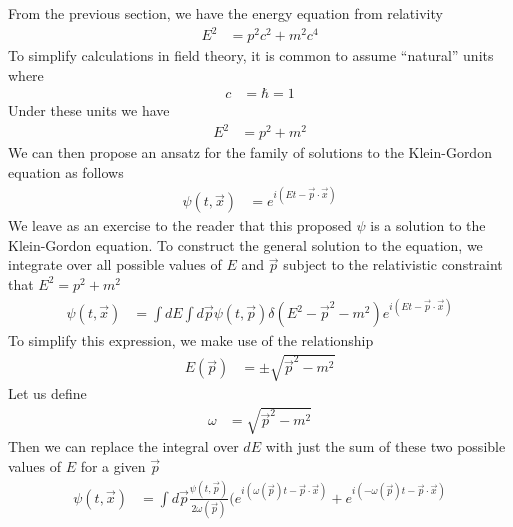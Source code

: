\documentclass[book.tex]{subfiles}
\begin{document}
From the previous section, we have the energy equation from relativity
\begin{align}
    E^2 &= p^2 c^2 + m^2 c^4
\end{align}
To simplify calculations in field theory, it is common to assume ``natural'' units where
\begin{align}
    c &= \hbar = 1
\end{align}
Under these units we have
\begin{align}
    E^2 &= p^2 + m^2
\end{align}
We can then propose an ansatz for the family of solutions to the Klein-Gordon equation as follows
\begin{align}
\psi(t, \vec{x}) &= e^{i(E t - \vec{p}\cdot \vec{x})}
\end{align}
We leave as an exercise to the reader that this proposed $\psi$ is a solution to the Klein-Gordon equation. To construct the general solution to the equation, we integrate over all possible values of $E$ and $\vec{p}$ subject to the relativistic constraint that $E^2 = p^2 + m^2$
\begin{align}
    \psi(t, \vec{x}) &= \int dE \int d\vec{p} \psi(t, \vec{p}) \delta(E^2 - \vec{p}^2 - m^2) e^{i(E t - \vec{p} \cdot \vec{x})}
\end{align}
To simplify this expression, we make use of the relationship
\begin{align}
E(\vec{p}) &= \pm \sqrt{\vec{p}^2 - m^2}
\end{align}
Let us define
\begin{align}
\omega &= \sqrt{\vec{p}^2 - m^2}
\end{align}
Then we can replace the integral over $dE$ with just the sum of these two possible values of $E$ for a given $\vec{p}$
\begin{align}
    \psi(t, \vec{x}) &= \int d\vec{p} \frac{\psi(t, \vec{p})}{2 \omega(\vec{p})} (e^{i(\omega(\vec{p}) t - \vec{p} \cdot \vec{x})} + e^{i(-\omega(\vec{p}) t - \vec{p} \cdot \vec{x})}
\end{align}
\end{document}
